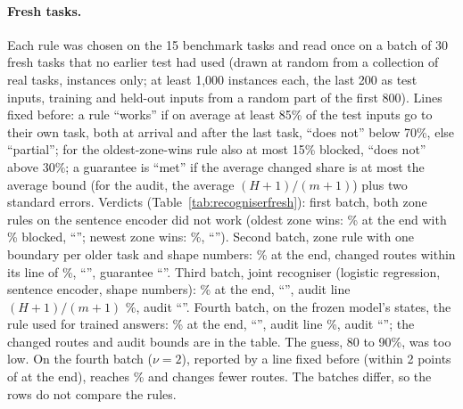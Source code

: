 \begin{table}[t]
  \caption{Four zone shapes, development data: the 15 SuperNI tasks, sentence encoder alone or with the 16 shape numbers (best weight tried). Rows: one flat boundary against everything older, one per older task, balls, boundaries curved by random cosine features. Means over tasks, in \%: own task after the last task; route changed. Bold: the variant chosen by the rule written before the grid.}
  \label{tab:shapesgrid}
  \centering
  
\end{table}

\paragraph{Fresh tasks.} Each rule was chosen on the 15 benchmark tasks and read once on a batch of 30 fresh tasks that no earlier test had used (drawn at random from a collection of real tasks, instances only; at least 1{,}000 instances each, the last 200 as test inputs, training and held-out inputs from a random part of the first 800).
Lines fixed before: a rule ``works'' if on average at least 85\% of the test inputs go to their own task, both at arrival and after the last task, ``does not'' below 70\%, else ``partial''; for the oldest-zone-wins rule also at most 15\% blocked, ``does not'' above 30\%; a guarantee is ``met'' if the average changed share is at most the average bound (for the audit, the average $(H{+}1)/(m{+}1)$) plus two standard errors.
Verdicts (Table~\ref{tab:recogniserfresh}): first batch, both zone rules on the sentence encoder did not work (oldest zone wins: \AudShapeFreshFirstOldestEnd{}\% at the end with \AudShapeFreshFirstOldestBlocked{}\% blocked, ``\AudShapeFreshFirstOldestUse{}''; newest zone wins: \AudShapeFreshFirstNewestEnd{}\%, ``\AudShapeFreshFirstNewestUse{}''). Second batch, zone rule with one boundary per older task and shape numbers: \AudShapeFreshSecondEnd{}\% at the end, changed routes within its line of \AudShapeFreshSecondBound{}\%, ``\AudShapeFreshSecondUse{}'', guarantee ``\AudShapeFreshSecondGuarantee{}''. Third batch, joint recogniser (logistic regression, sentence encoder, shape numbers): \AudFreshThirdEnd{}\% at the end, ``\AudFreshThirdUse{}'', audit line $(H{+}1)/(m{+}1)$ \AudFreshThirdAuditLine{}\%, audit ``\AudFreshThirdCert{}''. Fourth batch, \recog{} on the frozen model's states, the rule used for trained answers: \AudFreshFourthLEnd{}\% at the end, ``\AudFreshFourthUse{}'', audit line \AudFreshFourthLAuditLine{}\%, audit ``\AudFreshFourthCert{}''; the changed routes and audit bounds are in the table. The guess, 80 to 90\%, was too low.
On the fourth batch \handicap{} ($\nu = 2$), reported by a line fixed before (within 2 points of \recog{} at the end), reaches \AudFreshFourthHEnd{}\% and changes fewer routes. The batches differ, so the rows do not compare the rules.

